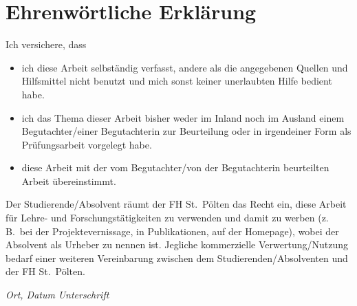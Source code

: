 
{%

\chapter*{Ehrenwörtliche Erklärung}\label{sec:declaration_de}


Ich versichere, dass


\begin{itemize}
    \item ich diese Arbeit selbständig verfasst, andere als die angegebenen Quellen und Hilfsmittel nicht benutzt und mich sonst keiner unerlaubten Hilfe bedient habe.


    \item ich das Thema dieser Arbeit bisher weder im Inland noch im Ausland einem Begutachter/einer Begutachterin zur Beurteilung oder in irgendeiner Form als Prüfungsarbeit vorgelegt habe.


    \item diese Arbeit mit der vom Begutachter/von der Begutachterin beurteilten Arbeit übereinstimmt.

\end{itemize}

Der Studierende/Absolvent räumt der FH St.\ Pölten das Recht ein, diese Arbeit für Lehre- und Forschungstätigkeiten zu verwenden und damit zu werben (z.\,B.\ bei der Projektevernissage, in Publikationen, auf der Homepage), wobei der Absolvent als Urheber zu nennen ist.
Jegliche kommerzielle Verwertung/Nutzung bedarf einer weiteren Vereinbarung zwischen dem Studierenden/Absolventen und der FH St.\ Pölten.


\vfill

\setlength{\unitlength}{120pt}

\alinie{}\hfill{}\alinie{}

\textit{Ort, Datum} \hfill \textit{Unterschrift}

}
